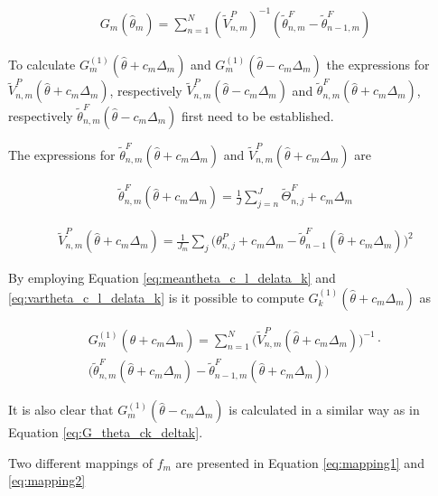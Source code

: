 \documentclass[twoside,openright]{report}
\begin{document}
\begin{align}
    G_m(\hat{\theta}_m) = \sum_{n=1}^{N} ( \widetilde{V}_{n,m}^{P} )^{-1} (\widetilde{\theta}_{n,m}^{F}  - \widetilde{\theta}_{n-1,m}^{F})
\end{align}

To calculate $G^{(1)}_{m}(\hat{\theta} + c_m \Delta_m )$ and $G^{(1)}_{m}(\hat{\theta} - c_m \Delta_m )$ the expressions for $\widetilde{V}_{n,m}^{P}(\hat{\theta} + c_m \Delta_m)$, respectively
$\widetilde{V}_{n,m}^{P}(\hat{\theta} - c_m \Delta_m)$  and $\widetilde{\theta}_{n,m}^{F}(\hat{\theta} + c_m \Delta_m)$, respectively $\widetilde{\theta}_{n,m}^{F}(\hat{\theta} - c_m \Delta_m)$ first need to be established.  

The expressions for $\widetilde{\theta}_{n,m}^{F}(\hat{\theta} + c_m \Delta_m)$ and $\widetilde{V}_{n,m}^{P}(\hat{\theta} + c_m \Delta_m)$ are 

\begin{align}
    \widetilde{\theta}_{n,m}^{F}(\hat{\theta} + c_m \Delta_m) = \frac{1}{J} \sum_{j = n}^{J} \widetilde{\Theta}_{n,j}^{F} + c_m \Delta_m \label{eq:meantheta_c_l_delata_k}
\end{align}

\begin{align}
    \widetilde{V}_{n,m}^{P}(\hat{\theta} + c_m \Delta_m ) = \frac{1}{J_m} \sum_{j} \Big( \theta^{P}_{n,j} + c_m \Delta_m - \widetilde{\theta}_{n-1}^{F}(\hat{\theta} + c_m \Delta_m ) \Big)^2  \label{eq:vartheta_c_l_delata_k}
\end{align}

By employing Equation \ref{eq:meantheta_c_l_delata_k} and \ref{eq:vartheta_c_l_delata_k} is it possible to compute  $G^{(1)}_{k}(\hat{\theta} + c_m \Delta_m )$  as

\begin{multline}
    G^{(1)}_{m}(\hat{\theta} + c_m \Delta_m ) =    \sum_{n=1}^{N} \big( \widetilde{V}_{n,m}^{P}(\hat{\theta} + c_m \Delta_m ) \big)^{-1} \cdot \\
    \big( \widetilde{\theta}_{n,m}^{F}(\hat{\theta} + c_m \Delta_m )  - \widetilde{\theta}_{n-1,m}^{F}(\hat{\theta} + c_m \Delta_m ) \big) \label{eq:G_theta_ck_deltak}
\end{multline}

It is also clear that $G^{(1)}_{m}(\hat{\theta} - c_m \Delta_m )$ is calculated in a similar way as in Equation \ref{eq:G_theta_ck_deltak}. 

Two different mappings of $f_m$ are presented in Equation \ref{eq:mapping1} and \ref{eq:mapping2} 
\end{document}
